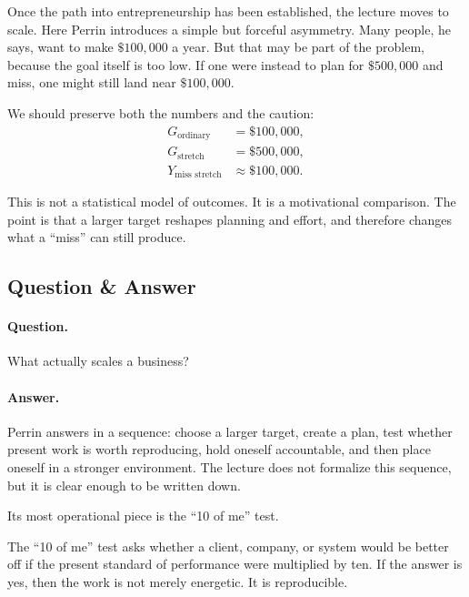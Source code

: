 Once the path into entrepreneurship has been established, the lecture moves to scale. Here Perrin introduces a simple but forceful asymmetry. Many people, he says, want to make \(\$100{,}000\) a year. But that may be part of the problem, because the goal itself is too low. If one were instead to plan for \(\$500{,}000\) and miss, one might still land near \(\$100{,}000\).

We should preserve both the numbers and the caution:
\begin{align}
G_{\text{ordinary}} &= \$100{,}000,\\
G_{\text{stretch}} &= \$500{,}000,\\
Y_{\text{miss stretch}} &\approx \$100{,}000.
\end{align}

\begin{remark}
This is not a statistical model of outcomes. It is a motivational comparison. The point is that a larger target reshapes planning and effort, and therefore changes what a ``miss'' can still produce.
\end{remark}

\subsection{Question \& Answer}

\paragraph{Question.} What actually scales a business?

\paragraph{Answer.} Perrin answers in a sequence: choose a larger target, create a plan, test whether present work is worth reproducing, hold oneself accountable, and then place oneself in a stronger environment. The lecture does not formalize this sequence, but it is clear enough to be written down.

Its most operational piece is the ``10 of me'' test.

\begin{definition}
The ``10 of me'' test asks whether a client, company, or system would be better off if the present standard of performance were multiplied by ten. If the answer is yes, then the work is not merely energetic. It is reproducible.
\end{definition}

